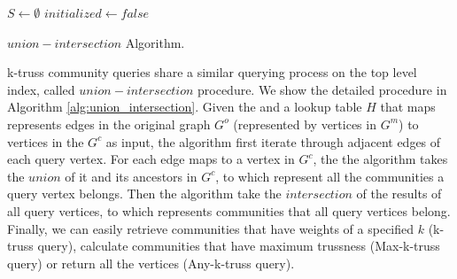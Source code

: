 \begin{algorithm}
	\BlankLine
	$S \gets \emptyset$\;
	$initialized \gets false$\;
	\BlankLine
	\caption{$union-intersection$ Algorithm.}\label{alg:union_intersection}
\end{algorithm}

\toplevelprob{} k-truss community queries share a similar querying process on the top level index, called $union-intersection$ procedure. We show the detailed procedure in Algorithm \ref{alg:union_intersection}. Given the \twolevelindex{} and a lookup table $H$ that maps represents edges in the original graph $G^o$ (represented by vertices in $G^m$) to vertices in the \treeindex{} $G^c$ as input, the algorithm first iterate through adjacent edges of each query vertex. For each edge maps to a vertex in $G^c$, the the algorithm takes the $union$ of it and its ancestors in $G^c$, to which represent all the communities a query vertex belongs. Then the algorithm take the $intersection$ of the results of all query vertices, to which represents communities that all query vertices belong. Finally, we can easily retrieve communities that have weights of a specified $k$ (k-truss query), calculate communities that have maximum trussness (Max-k-truss query) or return all the vertices (Any-k-truss query).  

